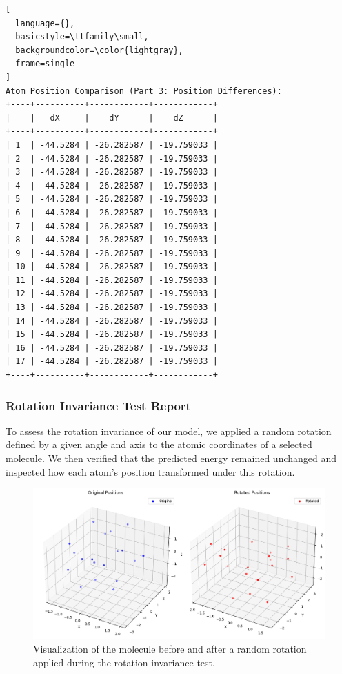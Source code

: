 \documentclass{article}
\begin{document}
\begin{lstlisting}[
  language={},
  basicstyle=\ttfamily\small,
  backgroundcolor=\color{lightgray},
  frame=single
]
Atom Position Comparison (Part 3: Position Differences):
+----+----------+------------+------------+
|    |   dX     |    dY      |    dZ      |
+----+----------+------------+------------+
| 1  | -44.5284 | -26.282587 | -19.759033 |
| 2  | -44.5284 | -26.282587 | -19.759033 |
| 3  | -44.5284 | -26.282587 | -19.759033 |
| 4  | -44.5284 | -26.282587 | -19.759033 |
| 5  | -44.5284 | -26.282587 | -19.759033 |
| 6  | -44.5284 | -26.282587 | -19.759033 |
| 7  | -44.5284 | -26.282587 | -19.759033 |
| 8  | -44.5284 | -26.282587 | -19.759033 |
| 9  | -44.5284 | -26.282587 | -19.759033 |
| 10 | -44.5284 | -26.282587 | -19.759033 |
| 11 | -44.5284 | -26.282587 | -19.759033 |
| 12 | -44.5284 | -26.282587 | -19.759033 |
| 13 | -44.5284 | -26.282587 | -19.759033 |
| 14 | -44.5284 | -26.282587 | -19.759033 |
| 15 | -44.5284 | -26.282587 | -19.759033 |
| 16 | -44.5284 | -26.282587 | -19.759033 |
| 17 | -44.5284 | -26.282587 | -19.759033 |
+----+----------+------------+------------+
\end{lstlisting}



\subsubsection{Rotation Invariance Test Report}


To assess the rotation invariance of our model, we applied a random rotation defined by a given angle and axis to the atomic coordinates of a selected molecule. We then verified that the predicted energy remained unchanged and inspected how each atom's position transformed under this rotation.


\begin{figure}[H]
  \centering
  \includegraphics[width=0.9\linewidth]{Images_Ayoub/Invariance/Transformers/Rotation.png}
  \caption{Visualization of the molecule before and after a random rotation applied during the rotation invariance test.}
  \label{fig:rotation_invariance_visualization}
\end{figure}
\end{document}
